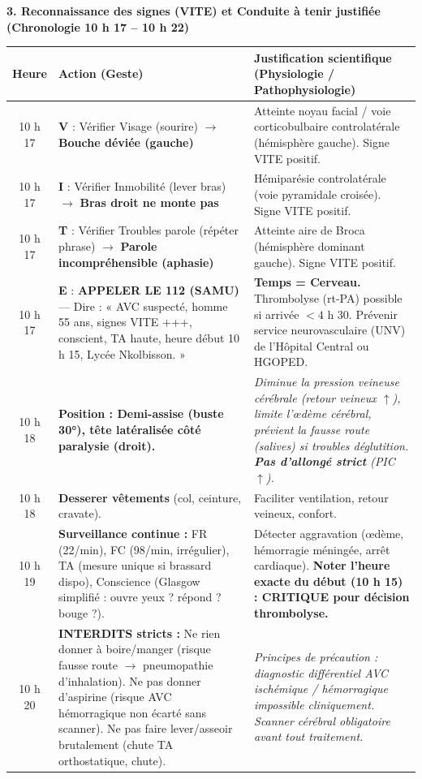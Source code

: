 \documentclass[11pt]{article}
\begin{document}
\begin{exoresolu}
\medskip
\noindent \textbf{3. Reconnaissance des signes (VITE) et Conduite à tenir justifiée (Chronologie 10 h 17 – 10 h 22)}

\begin{center}
\begin{tabularx}{\linewidth}{|c|l|X|}\hline
\rowcolor{popblueL} \textbf{Heure} & \textbf{Action (Geste)} & \textbf{Justification scientifique (Physiologie / Pathophysiologie)} \\ \hline
10 h 17 & \textbf{V} : Vérifier Visage (sourire) $\rightarrow$ \textbf{Bouche déviée (gauche)} & Atteinte noyau facial / voie corticobulbaire controlatérale (hémisphère gauche). Signe VITE positif. \\ \hline
10 h 17 & \textbf{I} : Vérifier Inmobilité (lever bras) $\rightarrow$ \textbf{Bras droit ne monte pas} & Hémiparésie controlatérale (voie pyramidale croisée). Signe VITE positif. \\ \hline
10 h 17 & \textbf{T} : Vérifier Troubles parole (répéter phrase) $\rightarrow$ \textbf{Parole incompréhensible (aphasie)} & Atteinte aire de Broca (hémisphère dominant gauche). Signe VITE positif. \\ \hline
10 h 17 & \textbf{E} : \textbf{APPELER LE 112 (SAMU)} — Dire : « AVC suspecté, homme 55 ans, signes VITE +++, conscient, TA haute, heure début 10 h 15, Lycée Nkolbisson. » & \textbf{Temps = Cerveau.} Thrombolyse (rt-PA) possible si arrivée $< 4$ h 30. Prévenir service neurovasculaire (UNV) de l'Hôpital Central ou HGOPED. \\ \hline
10 h 18 & \textbf{Position : Demi-assise (buste 30°), tête latéralisée côté paralysie (droit).} & \emph{Diminue la pression veineuse cérébrale (retour veineux $\uparrow$), limite l'œdème cérébral, prévient la fausse route (salives) si troubles déglutition. \textbf{Pas d'allongé strict} (PIC $\uparrow$).} \\ \hline
10 h 18 & \textbf{Desserer vêtements} (col, ceinture, cravate). & Faciliter ventilation, retour veineux, confort. \\ \hline
10 h 19 & \textbf{Surveillance continue :} FR (22/min), FC (98/min, irrégulier), TA (mesure unique si brassard dispo), Conscience (Glasgow simplifié : ouvre yeux ? répond ? bouge ?). & Détecter aggravation (œdème, hémorragie méningée, arrêt cardiaque). \textbf{Noter l'heure exacte du début (10 h 15) : CRITIQUE pour décision thrombolyse.} \\ \hline
10 h 20 & \textbf{INTERDITS stricts :} Ne rien donner à boire/manger (risque fausse route $\rightarrow$ pneumopathie d'inhalation). Ne pas donner d'aspirine (risque AVC hémorragique non écarté sans scanner). Ne pas faire lever/asseoir brutalement (chute TA orthostatique, chute). & \emph{Principes de précaution : diagnostic différentiel AVC ischémique / hémorragique impossible cliniquement. Scanner cérébral obligatoire avant tout traitement.} \\ \hline

\end{tabularx}
\end{center}
\end{exoresolu}
\end{document}

